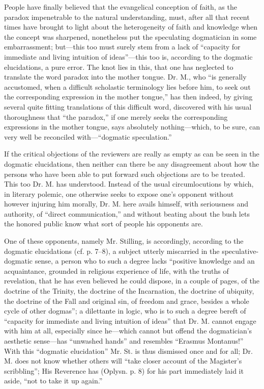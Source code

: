 \documentclass[12pt,a4paper,openany]{book}
\newcommand{\opage}[1]{\marginnote{\footnotesize\textit{[#1]}}}
\begin{document}
People have finally believed that the evangelical conception
of faith, as the paradox impenetrable to the natural understanding,
must, after all that recent times have
brought to light about the heterogeneity of faith and knowledge when the concept
was sharpened, nonetheless put the speculating dogmatician in some
embarrassment; but---this too must surely stem from a lack
of ``capacity for immediate and living intuition of ideas''---this
too is, according to the dogmatic elucidations, a pure
error. The knot lies in this, that one has neglected to translate
the word paradox into the mother tongue. Dr. M., who ``is
generally accustomed, when a difficult scholastic terminology
lies before him, to seek out the corresponding expression in the mother tongue,''
has then indeed, by giving several quite fitting
translations of this difficult word, discovered with his usual thoroughness
that ``the paradox,'' if one merely seeks the
corresponding expressions in the mother tongue, says absolutely nothing---which,
to be sure, can very well be reconciled with---``dogmatic
speculation.''

If the critical objections of the reviewers are really
as empty as can be seen in the dogmatic elucidations,
then neither can there be any disagreement about how the
persons who have been able to put forward such objections
are to be treated. This too Dr. M. has understood.
\setcounter{footnote}{0}%
\opage{6}Instead of the usual circumlocutions by which, in literary
polemic, one otherwise seeks to expose one's opponent without
however injuring him morally, Dr. M. here avails himself, with
seriousness and authority, of ``direct communication,'' and
without beating about the bush lets the honored public know what sort of people his
opponents are.

One of these opponents, namely Mr. Stilling,
is accordingly, according to the dogmatic elucidations (cf. p.
7--8), a subject utterly miscarried in the speculative-dogmatic sense,
a person who to such a degree lacks ``positive
knowledge and an acquaintance, grounded in religious experience of life,
with the truths of revelation, that he has even
believed he could dispose, in a couple of pages, of the doctrine of the Trinity,
the doctrine of the Incarnation, the doctrine of ubiquity, the doctrine of
the Fall and original sin, of freedom and grace, besides
a whole cycle of other dogmas''; a dilettante in logic,
who is to such a degree bereft of ``capacity for immediate and living
intuition of ideas'' that Dr. M. cannot engage with him at all,
especially since he---which cannot but offend the dogmatician's
aesthetic sense---has ``unwashed hands'' and resembles
``Erasmus Montanus!'' With this ``dogmatic elucidation''
Mr. St. is thus dismissed once and for all; Dr. M. does not know
whether others will ``take closer account of the Magister's
scribbling''; His Reverence has (Oplysn. p. 8) for his
part immediately laid it aside, ``not to take it up again.''
\end{document}
